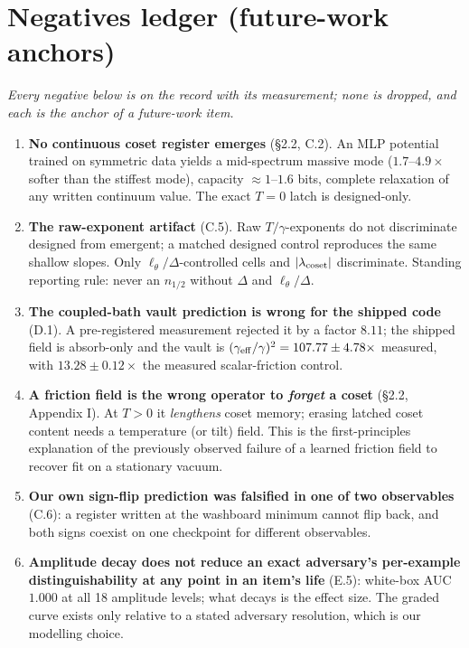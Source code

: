 \documentclass{article}
\begin{document}
\section{Negatives ledger (future-work anchors)}

\emph{Every negative below is on the record with its measurement; none is dropped, and each is the anchor of a future-work item.}

\begin{enumerate}
\item \textbf{No continuous coset register emerges} (\S 2.2, C.2). An MLP potential trained on symmetric data yields a mid-spectrum massive mode ($1.7$--$4.9\times$ softer than the stiffest mode), capacity $\approx1$--$1.6$ bits, complete relaxation of any written continuum value. The exact $T=0$ latch is designed-only.
\item \textbf{The raw-exponent artifact} (C.5). Raw $T/\gamma$-exponents do not discriminate designed from emergent; a matched designed control reproduces the same shallow slopes. Only $\ell_\theta/\Delta$-controlled cells and $|\lambda_{\rm coset}|$ discriminate. Standing reporting rule: never an $n_{1/2}$ without $\Delta$ and $\ell_\theta/\Delta$.
\item \textbf{The coupled-bath vault prediction is wrong for the shipped code} (D.1). A pre-registered measurement rejected it by a factor $8.11$; the shipped field is absorb-only and the vault is $(\gamma_{\rm eff}/\gamma)^2 = 107.77\pm4.78\times$ measured, with $13.28\pm0.12\times$ the measured scalar-friction control.
\item \textbf{A friction field is the wrong operator to \emph{forget} a coset} (\S 2.2, Appendix I). At $T>0$ it \emph{lengthens} coset memory; erasing latched coset content needs a temperature (or tilt) field. This is the first-principles explanation of the previously observed failure of a learned friction field to recover fit on a stationary vacuum.
\item \textbf{Our own sign-flip prediction was falsified in one of two observables} (C.6): a register written at the washboard minimum cannot flip back, and both signs coexist on one checkpoint for different observables.
\item \textbf{Amplitude decay does not reduce an exact adversary's per-example distinguishability at any point in an item's life} (E.5): white-box AUC $1.000$ at all 18 amplitude levels; what decays is the effect size. The graded curve exists only relative to a stated adversary resolution, which is our modelling choice.

\end{enumerate}
\end{document}
